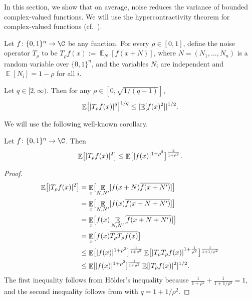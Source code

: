 \documentclass{toc}
\newcommand{\zo}{\{0,1\}}
\DeclarePairedDelimiter{\abs}{\lvert}{\rvert}
\DeclareMathOperator*{\E}{\mathbb{E}}                 %
\begin{document}
  In this section, we show that on average, noise reduces the variance of bounded complex-valued functions.  
  We will use the hypercontractivity theorem for complex-valued functions (cf.~\cite[Theorem~6.1.8]{Hatami-lecturenotes}).

  Let $f\colon \zo^n \to \C$ be any function.
  For every $\rho \in [0, 1]$, define the noise operator $T_{\rho}$ to be $T_\rho f(x) := \E_N[f(x + N)]$, where $N = (N_1, \ldots, N_n)$ is a random variable over $\zo^n$, and the variables $N_i$ are independent and $\E[N_i]=1-\rho$ for all $i$.
  \begin{theorem} \label{thm-HC}
    Let $q \in [2, \infty)$.
    Then for any $\rho \in [0, \sqrt{ 1 / (q-1) }]$, 
    \[
      \E \bigl[ \abs{ T_{\rho}f(x) }^q \bigr]^{1/q}
      \le \abs{\E[f(x)^2]}^{1/2} .
    \]
  \end{theorem}
  We will use the following well-known corollary.
  \begin{corollary} \label{cor-HC}
    Let $f\colon \zo^n \to \C$.  Then
    \[
      \E \bigl[ \abs{T_\rho f(x)}^2 \bigr]
      \le \E \bigl[ \abs{f(x)}^{1 + \rho^2} \bigr]^{\frac{2}{1 + \rho^2}}.
    \]
  \end{corollary}
  \begin{proof}
    \begin{align*}
      \E \bigl[ \abs{ T_\rho f(x) }^2 \bigr]
      &= \E_x \bigl[ \E_{N, N'}[f(x + N) \overline{f(x + N')} ] \bigr] \\
      &= \E_x \bigl[ \E_{N, N'}[f(x) \overline{f(x + N + N')} ] \bigr] \\
      &= \E_x \bigl[ f(x) \E_{N, N'}[\overline{f(x + N + N')} ] \bigr] \\
      &= \E_x \bigl[ f(x) \overline{T_{\rho} T_{\rho} f(x)} \bigr] \\
      &\le \E \bigl[ \abs{f(x)}^{1 + \rho^2} \bigr]^{\frac{1}{1 + \rho^2}} \E \bigl[ \abs{ T_\rho T_\rho f(x) }^{1 + \frac{1}{\rho^2}} \bigr]^{\frac{1}{1 + 1/\rho^2}} \\
      &\le \E[ \abs{f(x)}^{1 + \rho^2} ]^{\frac{1}{1 + \rho^2}} \E[ \abs{ T_{\rho}f(x) }^2 ]^{1/2} .
    \end{align*}
    The first inequality follows from H{\"o}lder's inequality because $\frac{1}{1 + \rho^2} + \frac{1}{1 + 1/\rho^2} = 1$, and the second inequality follows from  with $q = 1 + 1/\rho^2$.
  \end{proof}
\end{document}
